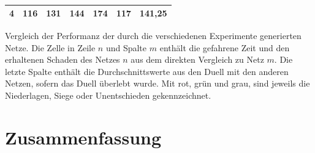 \documentclass[11pt,final,journal,a4paper,towside,towcolumn]{IEEEtran}
\begin{document}
\begin{table}
\begin{tabular}{|c|c|c|c|c|c|c|}
		\multirow{-2}{*}{4} & \cellcolor[HTML]{9AFF99}116                         & \cellcolor[HTML]{9AFF99}131  & \cellcolor[HTML]{9AFF99}144  & \cellcolor[HTML]{FFCCC9}174  & \cellcolor[HTML]{C0C0C0}117  & \cellcolor[HTML]{C0C0C0}141,25  \\ \hline 
	\end{tabular}
\caption{}{Vergleich der Performanz der durch die verschiedenen Experimente generierten Netze. Die Zelle in Zeile $n$ und Spalte $m$ enthält die gefahrene Zeit und den erhaltenen Schaden des Netzes $n$ aus dem direkten Vergleich zu Netz $m$. Die letzte Spalte enthält die Durchschnittswerte aus den Duell mit den anderen Netzen, sofern das Duell überlebt wurde. Mit rot, grün und grau, sind jeweils die Niederlagen, Siege oder Unentschieden gekennzeichnet.}
\end{table}
\section{Zusammenfassung}

{}

\end{document}
